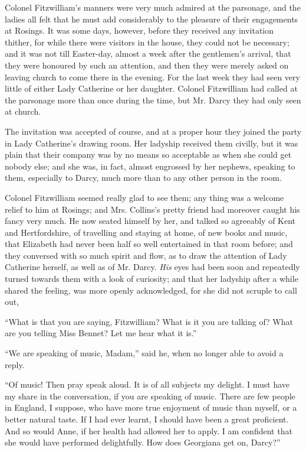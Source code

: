 
Colonel Fitzwilliam’s manners were very much admired
at the parsonage, and the ladies all felt that he
must add considerably to the pleasure of their engagements
at Rosings. It was some days, however, before
they received any invitation thither, for while there were
visitors in the house, they could not be necessary; and
it was not till Easter-day, almost a week after the gentlemen’s
arrival, that they were honoured by such an attention,
and then they were merely asked on leaving church
to come there in the evening. For the last week they had
seen very little of either Lady Catherine or her daughter.
Colonel Fitzwilliam had called at the parsonage more than
once during the time, but Mr. Darcy they had only seen
at church.

The invitation was accepted of course, and at a proper
hour they joined the party in Lady Catherine’s drawing
room. Her ladyship received them civilly, but it was
plain that their company was by no means so acceptable
as when she could get nobody else; and she was, in fact,
almost engrossed by her nephews, speaking to them,
especially to Darcy, much more than to any other person
in the room.

Colonel Fitzwilliam seemed really glad to see them;
any thing was a welcome relief to him at Rosings; and
Mrs. Collins’s pretty friend had moreover caught his fancy
very much. He now seated himself by her, and talked
so agreeably of Kent and Hertfordshire, of travelling and
staying at home, of new books and music, that Elizabeth
had never been half so well entertained in that room before;
and they conversed with so much spirit and flow, as to
draw the attention of Lady Catherine herself, as well as
of Mr. Darcy. \textit{His} eyes had been soon and repeatedly
turned towards them with a look of curiosity; and that
her ladyship after a while shared the feeling, was more
openly acknowledged, for she did not scruple to call out,

“What is that you are saying, Fitzwilliam? What is
it you are talking of? What are you telling Miss Bennet?
Let me hear what it is.”

“We are speaking of music, Madam,” said he, when
no longer able to avoid a reply.

“Of music! Then pray speak aloud. It is of all
subjects my delight. I must have my share in the conversation,
if you are speaking of music. There are few people
in England, I suppose, who have more true enjoyment
of music than myself, or a better natural taste.
If I had ever learnt, I should have been a great proficient.
And so would Anne, if her health had allowed her to apply.
I am confident that she would have performed delightfully.
How does Georgiana get on, Darcy?”


